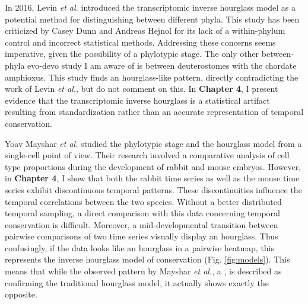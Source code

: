 In 2016, Levin \textit{et al.} introduced the transcriptomic inverse hourglass model as a potential method for distinguishing between different phyla\cite{Levin2016}. This study has been criticized by Casey Dunn and Andreas Hejnol for its lack of a within-phylum control\cite{hejnol2016} and incorrect statistical methods\cite{Dunn2018}. Addressing these concerns seems imperative, given the possibility of a  phylotypic stage. The only other between-phyla evo-devo study I am aware of is between deuterostomes with the chordate amphioxus\cite{PerezPosada2022}. This study finds an hourglass-like pattern, directly contradicting the work of Levin \textit{et al.}, but do not comment on this. In \textbf{Chapter 4}, I present evidence that the transcriptomic inverse hourglass is a statistical artifact resulting from standardization rather than an accurate representation of temporal conservation. 

Yoav Mayshar \textit{et al.} studied the phylotypic stage and the hourglass model from a single-cell point of view\cite{Mayshar2023}. Their research involved a comparative analysis of cell type proportions during the development of rabbit and mouse embryos. However, in \textbf{Chapter 4}, I show that both the rabbit time series as well as the mouse time series exhibit discontinuous temporal patterns. These discontinuities influence the temporal correlations between the two species. Without a better distributed temporal sampling, a direct comparison with this data concerning temporal conservation is difficult. Moreover, a mid-developmental transition between pairwise comparisons of two time series visually display an hourglass. Thus confusingly, if the data looks like an hourglass in a pairwise heatmap, this represents the inverse hourglass model of conservation (Fig. \ref{fig:models}). This means that while the observed pattern by Mayshar \textit{et al.}, a , is described as confirming the traditional hourglass model, it actually shows exactly the opposite. 

